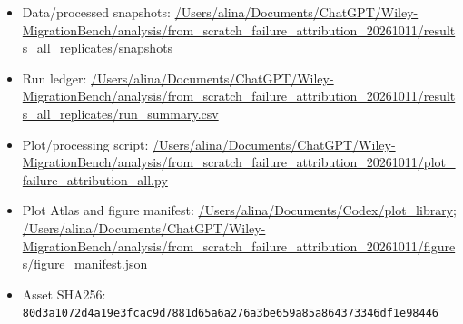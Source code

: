 \begin{itemize}[leftmargin=1.4em,noitemsep]
\item Data/processed snapshots: \begingroup\scriptsize\url{/Users/alina/Documents/ChatGPT/Wiley-MigrationBench/analysis/from_scratch_failure_attribution_20261011/results_all_replicates/snapshots}\endgroup
\item Run ledger: \begingroup\scriptsize\url{/Users/alina/Documents/ChatGPT/Wiley-MigrationBench/analysis/from_scratch_failure_attribution_20261011/results_all_replicates/run_summary.csv}\endgroup
\item Plot/processing script: \begingroup\scriptsize\url{/Users/alina/Documents/ChatGPT/Wiley-MigrationBench/analysis/from_scratch_failure_attribution_20261011/plot_failure_attribution_all.py}\endgroup
\item Plot Atlas and figure manifest: \begingroup\scriptsize\url{/Users/alina/Documents/Codex/plot_library}\endgroup; \url{/Users/alina/Documents/ChatGPT/Wiley-MigrationBench/analysis/from_scratch_failure_attribution_20261011/figures/figure_manifest.json}
\item Asset SHA256: \texttt{80d3a1072d4a19e3fcac9d7881d65a6a276a3be659a85a864373346df1e98446}
\end{itemize}
